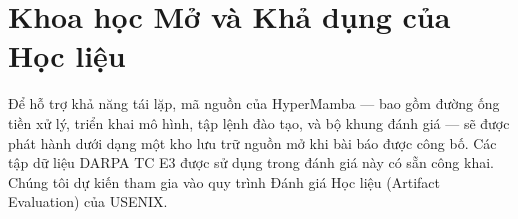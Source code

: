 \documentclass[letterpaper,twocolumn,10pt]{article}
\begin{document}
\section*{Khoa học Mở và Khả dụng của Học liệu}

Để hỗ trợ khả năng tái lặp, mã nguồn của HyperMamba --- bao gồm đường ống tiền xử lý, triển khai mô hình, tập lệnh đào tạo, và bộ khung đánh giá --- sẽ được phát hành dưới dạng một kho lưu trữ nguồn mở khi bài báo được công bố. Các tập dữ liệu DARPA TC E3 được sử dụng trong đánh giá này có sẵn công khai. Chúng tôi dự kiến tham gia vào quy trình Đánh giá Học liệu (Artifact Evaluation) của USENIX.



\end{document}

